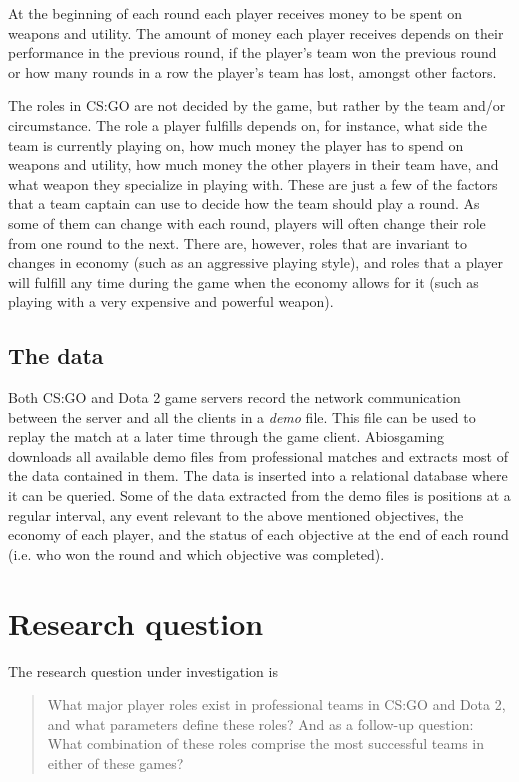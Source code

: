 \documentclass{article}
\begin{document}
At the beginning of each round each player receives money to be spent on weapons and utility. The amount of money each player receives depends on their performance in the previous round, if the player's team won the previous round or how many rounds in a row the player's team has lost, amongst other factors.

The roles in CS:GO are not decided by the game, but rather by the team and/or circumstance. The role a player fulfills depends on, for instance, what side the team is currently playing on, how much money the player has to spend on weapons and utility, how much money the other players in their team have, and what weapon they specialize in playing with. These are just a few of the factors that a team captain can use to decide how the team should play a round. As some of them can change with each round, players will often change their role from one round to the next. There are, however, roles that are invariant to changes in economy (such as an aggressive playing style), and roles that a player will fulfill any time during the game when the economy allows for it (such as playing with a very expensive and powerful weapon).

\subsection{The data}
Both CS:GO and Dota 2 game servers record the network communication between the server and all the clients in a {\it demo} file. This file can be used to replay the match at a later time through the game client. Abiosgaming downloads all available demo files from professional matches and extracts most of the data contained in them. The data is inserted into a relational database where it can be queried. Some of the data extracted from the demo files is positions at a regular interval, any event relevant to the above mentioned objectives, the economy of each player, and the status of each objective at the end of each round (i.e. who won the round and which objective was completed).

\section{Research question}
The research question under investigation is
\begin{quote}
    What major player roles exist in professional teams in CS:GO and Dota 2, and what parameters define these roles? And as a follow-up question: What combination of these roles comprise the most successful teams in either of these games?
\end{quote}
\end{document}
